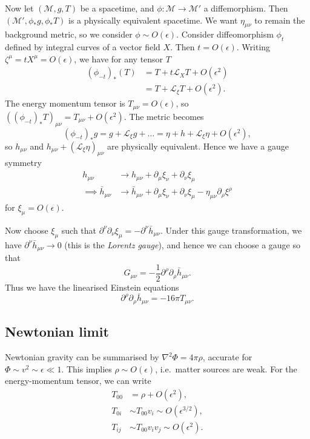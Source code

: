 \documentclass{jknotes}
\begin{document}
Now let \((\mathcal{M},g,T)\) be a spacetime, and \(\phi:\mathcal{M}\to\mathcal{M}'\) a diffemorphism. Then \((\mathcal{M}',\phi_*g,\phi_*T)\) is a physically equivalent spacetime. We want \(\eta_{\mu\nu}\) to remain the background metric, so we consider \(\phi\sim O(\epsilon)\). Consider diffeomorphism \(\phi_t\) defined by integral curves of a vector field \(X\). Then \(t=O(\epsilon)\). Writing \(\zeta^\mu = tX^\mu = O(\epsilon)\), we have for any tensor \(T\)
\begin{align}
    (\phi_{-t})_*(T) &= T + t\mathcal{L}_XT + O(\epsilon^2) \\
                     &= T + \mathcal{L}_\xi T + O(\epsilon^2).
\end{align}
The energy momentum tensor is \(T_{\mu\nu} = O(\epsilon)\), so \(((\phi_{-t})_*T)_{\mu\nu} = T_{\mu\nu} + O(\epsilon^2)\). The metric becomes
\begin{equation}
    (\phi_{-t})_* g = g + \mathcal{L}_\xi g + \dots = \eta + h + \mathcal{L}_\xi\eta + O(\epsilon^2),
\end{equation}
so \(h_{\mu\nu}\) and \(h_{\mu\nu} + (\mathcal{L}_\xi\eta)_{\mu\nu}\) are physically equivalent. Hence we have a gauge symmetry
\begin{align}
    h_{\mu\nu} &\to h_{\mu\nu} + \partial_\mu \xi_\nu + \partial_\nu \xi_\mu \\
    \implies \bar{h}_{\mu\nu} &\to \bar{h}_{\mu\nu} + \partial_\mu \xi_\nu + \partial_\nu \xi_\mu - \eta_{\mu\nu} \partial_\rho \xi^\rho
\end{align}
for \(\xi_\mu = O(\epsilon)\).

Now choose \(\xi_\mu\) such that \(\partial^\nu\partial_\nu\xi_\mu = -\partial^\nu\bar{h}_{\mu\nu}\). Under this gauge transformation, we have \(\partial^\nu \bar{h}_{\mu\nu} \to 0\) (this is the \emph{Lorentz gauge}), and hence we can choose a gauge so that 
\begin{equation}
    G_{\mu\nu} = -\frac12 \partial^\rho\partial_\rho \bar{h}_{\mu\nu}.
\end{equation}
Thus we have the linearised Einstein equations
\begin{equation}
    \partial^\rho\partial_\rho\bar{h}_{\mu\nu} = -16\pi T_{\mu\nu}.
\end{equation}

\subsection{Newtonian limit}
Newtonian gravity can be summarised by \(\nabla^2\Phi = 4\pi \rho\), accurate for \(\Phi\sim v^2\sim\epsilon \ll 1\). This implies \(\rho \sim O(\epsilon)\), i.e.\ matter sources are weak. For the energy-momentum tensor, we can write
\begin{align}
    T_{00} &= \rho + O(\epsilon^2), \\
    T_{0i} &\sim T_{00} v_i \sim O(\epsilon^{3/2}), \\
    T_{ij} &\sim T_{00}v_iv_j\sim O(\epsilon^2).
\end{align}
\end{document}
